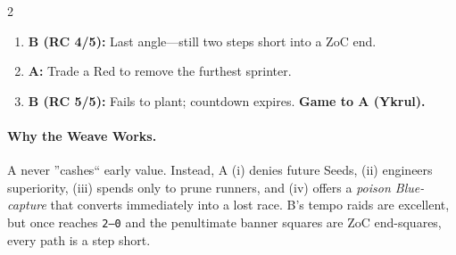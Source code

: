 \begin{multicols}{2}
\begin{enumerate}[leftmargin=\textit{,itemsep=0.35em,label=\textbf{M\arabic}:}]
\item \textbf{B (RC 4/5):} Last angle---still two steps short into a ZoC end.

\item \textbf{A:} Trade a Red to remove the furthest sprinter.

\item \textbf{B (RC 5/5):} Fails to plant; countdown expires. \textbf{Game to A (Ykrul).}

\end{enumerate}
\end{multicols}

\paragraph{Why the Weave Works.}
A never ''cashes`` early value. Instead, A (i) denies future Seeds, (ii) engineers \CapC{} superiority, (iii) spends \SC{} only to prune runners, and (iv) offers a \emph{poison Blue-capture} that converts immediately into a lost \RC{} race. B's tempo raids are excellent, but once \CapC{} reaches \texttt{2--0} and the penultimate banner squares are ZoC end-squares, every path is a step short.

